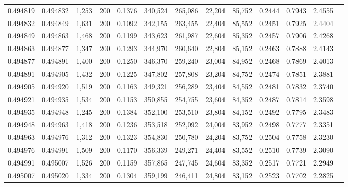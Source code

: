 \begin{tabular}{rrrrrrrrrrrrr}
0.494819 & 0.494832 &  1,253 & 200 &                                     0.1376 & 340,524 & 265,086 &  22,204 &  85,752 & 0.2444 & 0.7943 & 2.4555 \\
0.494832 & 0.494849 &  1,631 & 200 &                                     0.1092 & 342,155 & 263,455 &  22,404 &  85,552 & 0.2451 & 0.7925 & 2.4404 \\
0.494849 & 0.494863 &  1,468 & 200 &                                     0.1199 & 343,623 & 261,987 &  22,604 &  85,352 & 0.2457 & 0.7906 & 2.4268 \\
0.494863 & 0.494877 &  1,347 & 200 &                                     0.1293 & 344,970 & 260,640 &  22,804 &  85,152 & 0.2463 & 0.7888 & 2.4143 \\
0.494877 & 0.494891 &  1,400 & 200 &                                     0.1250 & 346,370 & 259,240 &  23,004 &  84,952 & 0.2468 & 0.7869 & 2.4013 \\
0.494891 & 0.494905 &  1,432 & 200 &                                     0.1225 & 347,802 & 257,808 &  23,204 &  84,752 & 0.2474 & 0.7851 & 2.3881 \\
0.494905 & 0.494920 &  1,519 & 200 &                                     0.1163 & 349,321 & 256,289 &  23,404 &  84,552 & 0.2481 & 0.7832 & 2.3740 \\
0.494921 & 0.494935 &  1,534 & 200 &                                     0.1153 & 350,855 & 254,755 &  23,604 &  84,352 & 0.2487 & 0.7814 & 2.3598 \\
0.494935 & 0.494948 &  1,245 & 200 &                                     0.1384 & 352,100 & 253,510 &  23,804 &  84,152 & 0.2492 & 0.7795 & 2.3483 \\
0.494948 & 0.494963 &  1,418 & 200 &                                     0.1236 & 353,518 & 252,092 &  24,004 &  83,952 & 0.2498 & 0.7777 & 2.3351 \\
0.494963 & 0.494976 &  1,312 & 200 &                                     0.1323 & 354,830 & 250,780 &  24,204 &  83,752 & 0.2504 & 0.7758 & 2.3230 \\
0.494976 & 0.494991 &  1,509 & 200 &                                     0.1170 & 356,339 & 249,271 &  24,404 &  83,552 & 0.2510 & 0.7739 & 2.3090 \\
0.494991 & 0.495007 &  1,526 & 200 &                                     0.1159 & 357,865 & 247,745 &  24,604 &  83,352 & 0.2517 & 0.7721 & 2.2949 \\
0.495007 & 0.495020 &  1,334 & 200 &                                     0.1304 & 359,199 & 246,411 &  24,804 &  83,152 & 0.2523 & 0.7702 & 2.2825 \\

\end{tabular}
